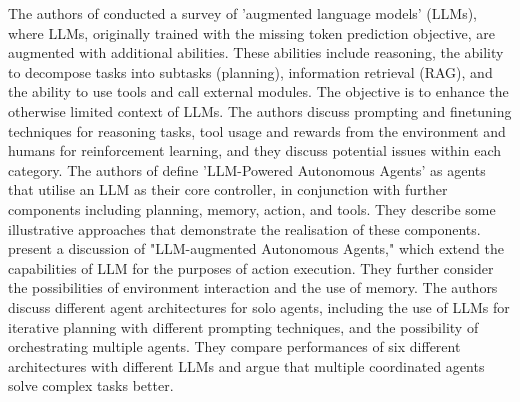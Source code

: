 \documentclass{article}
\begin{document}
The authors of \cite{mialon_augmented_2023} conducted a survey of 'augmented language models' (LLMs), where LLMs, originally trained with the missing token prediction objective, are augmented with additional abilities. These abilities include reasoning, the ability to decompose tasks into subtasks (planning), information retrieval (RAG), and the ability to use tools and call external modules. The objective is to enhance the otherwise limited context of LLMs. The authors discuss prompting and finetuning techniques for reasoning tasks, tool usage and  rewards from the environment and humans for reinforcement learning, and they discuss potential issues within each category. 
The authors of \cite{weng_llm_2023} define 'LLM-Powered Autonomous Agents' as agents that utilise an LLM as their core controller, in conjunction with further components including planning, memory, action, and tools. They describe some illustrative approaches that demonstrate the realisation of these components. %
\cite{liu_bolaa_2023} present a discussion of "LLM-augmented Autonomous Agents," which extend the capabilities of LLM for the purposes of action execution. They further consider the possibilities of environment interaction and the use of memory. The authors discuss different agent architectures for solo agents, including the use of LLMs for iterative planning with different prompting techniques, and the possibility of orchestrating multiple agents. They compare  performances of six different architectures with different LLMs and argue that multiple coordinated agents solve complex tasks better. 
\end{document}
